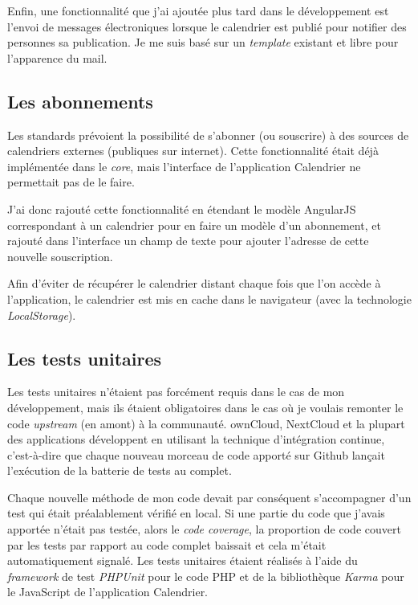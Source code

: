 \documentclass[10pt,a4paper, twoside]{report}
\begin{document}
	Enfin, une fonctionnalité que j'ai ajoutée plus tard dans le développement est l'envoi de messages électroniques lorsque le calendrier est publié pour notifier des personnes sa publication. Je me suis basé sur un \textit{template} existant et libre pour l'apparence du mail.
	
	\subsection{Les abonnements}
	Les standards prévoient la possibilité de s'abonner (ou souscrire) à des sources de calendriers externes (publiques sur internet). Cette fonctionnalité était déjà implémentée dans le \textit{core}, mais l'interface de l'application Calendrier ne permettait pas de le faire. 
	
	J'ai donc rajouté cette fonctionnalité en étendant le modèle AngularJS correspondant à un calendrier pour en faire un modèle d'un abonnement, et rajouté dans l'interface un champ de texte pour ajouter l'adresse de cette nouvelle souscription. 
	
	Afin d'éviter de récupérer le calendrier distant chaque fois que l'on accède à l'application, le calendrier est mis en cache dans le navigateur (avec la technologie \textit{LocalStorage}).
	
	\subsection{Les tests unitaires}
	Les tests unitaires n'étaient pas forcément requis dans le cas de mon développement, mais ils étaient obligatoires dans le cas où je voulais remonter le code \textit{upstream} (en amont) à la communauté. ownCloud, NextCloud et la plupart des applications développent en utilisant la technique d'intégration continue, c'est-à-dire que chaque nouveau morceau de code apporté sur Github lançait l'exécution de la batterie de tests au complet. 
	
	Chaque nouvelle méthode de mon code devait par conséquent s'accompagner d'un test qui était préalablement vérifié en local. Si une partie du code que j'avais apportée n'était pas testée, alors le \textit{code coverage}, la proportion de code couvert par les tests par rapport au code complet baissait et cela m'était automatiquement signalé. Les tests unitaires étaient réalisés à l'aide du \textit{framework} de test \textit{PHPUnit} pour le code PHP et de la bibliothèque \textit{Karma} pour le JavaScript de l'application Calendrier.
	
\end{document}
